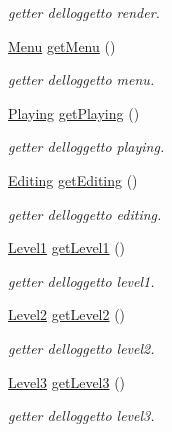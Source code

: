 \begin{DoxyCompactItemize}
\begin{DoxyCompactList}\small\item\em getter dell\textquotesingle{}oggetto render. \end{DoxyCompactList}\item 
\hyperlink{classscenes_1_1_menu}{Menu} \hyperlink{classprogetto_1_1_game_a32527bf330947f1c1d1f5a7da9d12940}{get\+Menu} ()
\begin{DoxyCompactList}\small\item\em getter dell\textquotesingle{}oggetto menu. \end{DoxyCompactList}\item 
\hyperlink{classscenes_1_1_playing}{Playing} \hyperlink{classprogetto_1_1_game_a5ef843d72d0871e312ff734c6a129dd2}{get\+Playing} ()
\begin{DoxyCompactList}\small\item\em getter dell\textquotesingle{}oggetto playing. \end{DoxyCompactList}\item 
\hyperlink{classscenes_1_1_editing}{Editing} \hyperlink{classprogetto_1_1_game_a0f1448e932e53b14606a448017e76c6c}{get\+Editing} ()
\begin{DoxyCompactList}\small\item\em getter dell\textquotesingle{}oggetto editing. \end{DoxyCompactList}\item 
\hyperlink{classscenes_1_1_level1}{Level1} \hyperlink{classprogetto_1_1_game_a6991f76e58df8f4b9bc8e94e3389d150}{get\+Level1} ()
\begin{DoxyCompactList}\small\item\em getter dell\textquotesingle{}oggetto level1. \end{DoxyCompactList}\item 
\hyperlink{classscenes_1_1_level2}{Level2} \hyperlink{classprogetto_1_1_game_a26827f97d382e852c53c15990619c8b7}{get\+Level2} ()
\begin{DoxyCompactList}\small\item\em getter dell\textquotesingle{}oggetto level2. \end{DoxyCompactList}\item 
\hyperlink{classscenes_1_1_level3}{Level3} \hyperlink{classprogetto_1_1_game_a0869f04fd1631b5ad909e51c85e9e57b}{get\+Level3} ()
\begin{DoxyCompactList}\small\item\em getter dell\textquotesingle{}oggetto level3. \end{DoxyCompactList}\item 

\end{DoxyCompactItemize}
